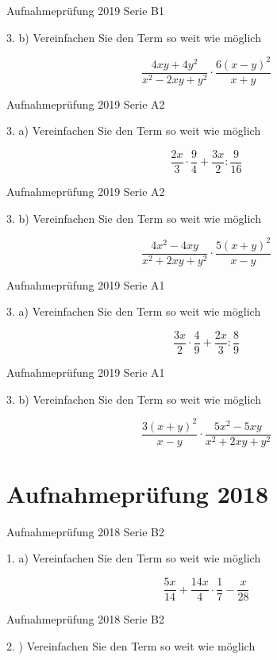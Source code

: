 {
Aufnahmeprüfung 2019 Serie B1

3. b) Vereinfachen Sie den Term so weit wie möglich

$$\frac{4xy+4y^2}{x^2-2xy+y^2} \cdot{} \frac{6(x-y)^2}{x+y}$$

Aufnahmeprüfung 2019 Serie A2

3. a) Vereinfachen Sie den Term so weit wie möglich

$$\frac{2x}{3} \cdot{} \frac{9}{4} + \frac{3x}{2} : \frac{9}{16}$$

Aufnahmeprüfung 2019 Serie A2

3. b) Vereinfachen Sie den Term so weit wie möglich

$$\frac{4x^2-4xy}{x^2+2xy+y^2} \cdot{} \frac{5(x+y)^2}{x-y}$$

Aufnahmeprüfung 2019 Serie A1

3. a) Vereinfachen Sie den Term so weit wie möglich

$$\frac{3x}2 \cdot{} \frac49 + \frac{2x}3 : \frac89$$

Aufnahmeprüfung 2019 Serie A1

3. b) Vereinfachen Sie den Term so weit wie möglich

$$\frac{3(x+y)^2}{x-y} \cdot{} \frac{5x^2-5xy}{x^2+2xy+y^2}$$

\section*{Aufnahmeprüfung 2018}
Aufnahmeprüfung 2018 Serie B2

1. a) Vereinfachen Sie den Term so weit wie möglich

$$\frac{5x}{14} + \frac{14x}4 \cdot{} \frac17 - \frac{x}{28}$$

Aufnahmeprüfung 2018 Serie B2

2. ) Vereinfachen Sie den Term so weit wie möglich

}
